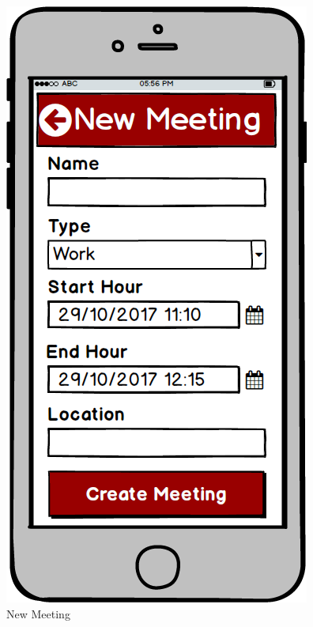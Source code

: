 \begin{figure}[!htb]
\begin{minipage}[b]{0.3\textwidth}
	\includegraphics[scale=0.3]{images/NewMeeting}
	\caption{New Meeting}
	\label{ref:newMeeting}
\end{minipage}

\end{figure}

